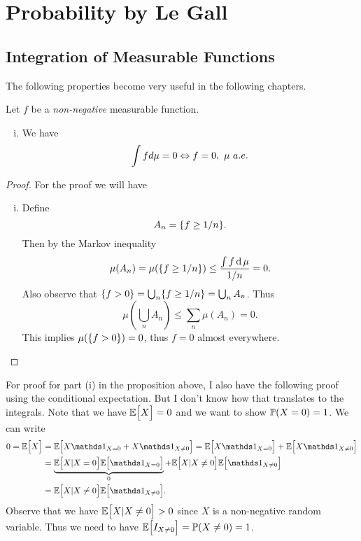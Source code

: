 \chapter{Probability by Le Gall}

\section{Integration of Measurable Functions}

The following properties become very useful in the following chapters. 
\begin{proposition}
	Let $ f $ be a \emph{non-negative} measurable function.
	\begin{enumerate}[(i)]
		\item We have
		\[ \int f d\mu = 0 \Leftrightarrow f = 0,\ \mu\ a.e. \]
	\end{enumerate}
\end{proposition}
\begin{proof}
	For the proof we will have
	\begin{enumerate}[(i)]
		\item Define 
		\[ A_n = \{f \geq 1/n\}. \]
		Then by the Markov inequality
		\[ \mu(A_n) = \mu(\{f \geq 1/n\}) \leq \frac{\int f\operatorname{d}\mu}{1/n} = 0. \]
		Also observe that $ \{f > 0\} = \bigcup_n \{f \geq 1/n\} = \bigcup_n A_n $. Thus
		\[ \mu(\bigcup_n A_n) \leq \sum_n \mu(A_n) = 0. \]
		This implies $ \mu(\{f>0\}) = 0 $, thus $ f = 0 $ almost everywhere.
		
	\end{enumerate}
\end{proof}
\begin{remark}
	For proof for part (i) in the proposition above, I also have the following proof using the conditional expectation. But I don't know how that translates to the integrals. Note that we have $ \mathbb{E}\big[X\big] = 0 $ and we want to show $ \mathbb{P}(X = 0) = 1 $. We can write
	\begin{align*}
		0 = \E{X} &= \E{X\I_{X=0} + X\I_{X\neq 0}} = \E{X\I_{X=0}} + \E{X\I_{X\neq0}} \\
		&= \underbrace{\E{X|X=0}\E{\I_{X=0}}}_{0} + \E{X|X\neq 0} \E{\I_{X\neq 0}} \\
		&= \E{X|X\neq 0} \E{\I_{X\neq 0}}.
	\end{align*}
	Observe that we have $ \mathbb{E}\big[X|X\neq 0\big] > 0 $ since $ X $ is a non-negative random variable. Thus we need to have $ \mathbb{E}\big[I_{X\neq 0}\big] = \mathbb{P}(X\neq0) = 1 $.
\end{remark}